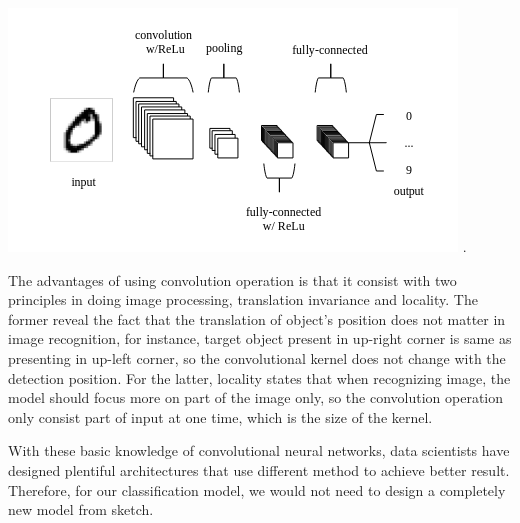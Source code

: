                     \begin{Figure}
                        \centering
                        \includegraphics[width=\linewidth]{Image/CNNs.png}
                        .
                    \end{Figure}

                    The advantages of using convolution operation is that it consist with two principles in doing image processing, translation invariance and locality. The former reveal the fact that the translation of object's position does not matter in image recognition, for instance, target object present in up-right corner is same as presenting in up-left corner, so the convolutional kernel does not change with the detection position\cite{zhang2023dive}. For the latter, locality states that when recognizing image, the model should focus more on part of the image only, so the convolution operation only consist part of input at one time, which is the size of the kernel.

                    With these basic knowledge of convolutional neural networks, data scientists have designed plentiful architectures that use different method to achieve better result. Therefore, for our classification model, we would not need to design a completely new model from sketch.

